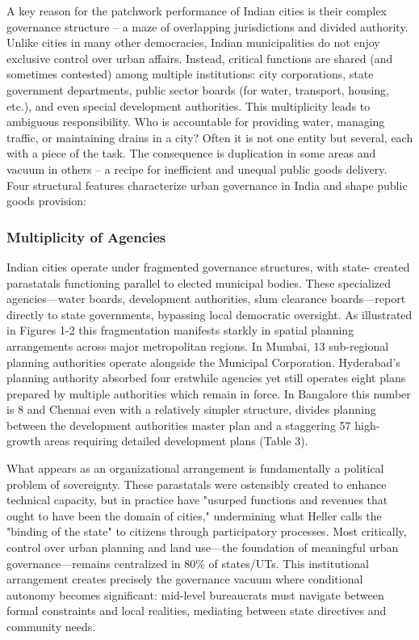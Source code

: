 A key reason for the patchwork performance of Indian cities is their complex governance structure – a maze of overlapping jurisdictions and divided authority. Unlike cities in many other democracies, Indian municipalities do not enjoy exclusive control over urban affairs. Instead, critical functions are shared (and sometimes contested) among multiple institutions: city corporations, state government departments, public sector boards (for water, transport, housing, etc.), and even special development authorities. This multiplicity leads to ambiguous responsibility. Who is accountable for providing water, managing traffic, or maintaining drains in a city? Often it is not one entity but several, each with a piece of the task. The consequence is duplication in some areas and vacuum in others – a recipe for inefficient and unequal public goods delivery. Four structural features characterize urban governance in India and shape public goods provision:


\subsubsection*{Multiplicity of Agencies}

Indian cities operate under fragmented governance structures, with state- created parastatals functioning parallel to elected municipal bodies. These specialized agencies—water boards, development authorities, slum clearance boards—report directly to state governments, bypassing local democratic oversight. As illustrated in Figures 1-2 this fragmentation manifests starkly in spatial planning arrangements across major metropolitan regions. In Mumbai, 13 sub-regional planning authorities operate alongside the Municipal Corporation. Hyderabad's planning authority absorbed four erstwhile agencies yet still operates eight plans prepared by multiple authorities which remain in force. In Bangalore this number is 8 and Chennai even with a relatively simpler structure, divides planning between the development authorities master plan and a staggering 57 high-growth areas requiring detailed development plans (Table 3).

What appears as an organizational arrangement is fundamentally a political problem of sovereignty. These parastatals were ostensibly created to enhance technical capacity, but in practice have "usurped functions and revenues that ought to have been the domain of cities," undermining what Heller calls the "binding of the state" to citizens through participatory processes. Most critically, control over urban planning and land use—the foundation of meaningful urban governance—remains centralized in 80\% of states/UTs. This institutional arrangement creates precisely the governance vacuum where conditional autonomy becomes significant: mid-level bureaucrats must navigate between formal constraints and local realities, mediating between state directives and community needs.

